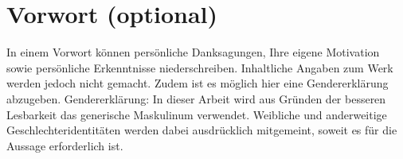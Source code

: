 
\clearpage
\chapter*{Vorwort (optional)}
In einem Vorwort können persönliche Danksagungen, Ihre eigene Motivation sowie persönliche Erkenntnisse niederschreiben. 
Inhaltliche Angaben zum Werk werden jedoch nicht gemacht. Zudem ist es möglich hier eine Gendererklärung abzugeben.
Gendererklärung:
In dieser Arbeit wird aus Gründen der besseren Lesbarkeit das generische Maskulinum verwendet. 
Weibliche und anderweitige Geschlechteridentitäten werden dabei ausdrücklich mitgemeint, soweit es für die Aussage erforderlich ist.
